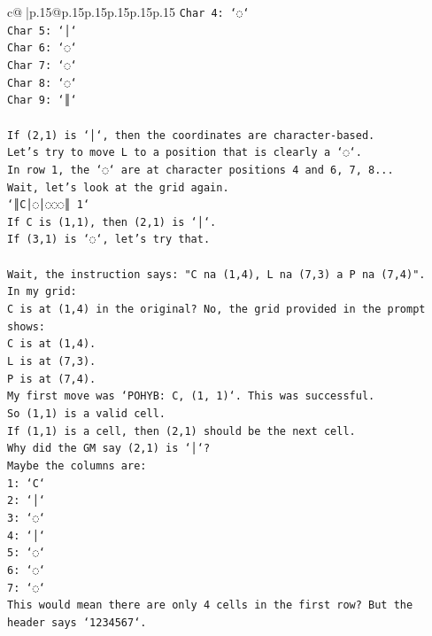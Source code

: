 \documentclass{article}
\begin{document}
{\begin{supertabular}{c@{$\;$}|p{.15\linewidth}@{}p{.15\linewidth}p{.15\linewidth}p{.15\linewidth}p{.15\linewidth}p{.15\linewidth}}
{{{\texttt{Char 4: `◌`} \\
\texttt{Char 5: `│`} \\
\texttt{Char 6: `◌`} \\
\texttt{Char 7: `◌`} \\
\texttt{Char 8: `◌`} \\
\texttt{Char 9: `║`} \\
\\ 
\texttt{If (2,1) is `│`, then the coordinates are character{-}based.} \\
\texttt{Let's try to move L to a position that is clearly a `◌`.} \\
\texttt{In row 1, the `◌` are at character positions 4 and 6, 7, 8...} \\
\texttt{Wait, let's look at the grid again.} \\
\texttt{`║C│◌│◌◌◌║ 1`} \\
\texttt{If C is (1,1), then (2,1) is `│`.} \\
\texttt{If (3,1) is `◌`, let's try that.} \\
\\ 
\texttt{Wait, the instruction says: "C na (1,4), L na (7,3) a P na (7,4)".} \\
\texttt{In my grid:} \\
\texttt{C is at (1,4) in the original? No, the grid provided in the prompt shows:} \\
\texttt{C is at (1,4).} \\
\texttt{L is at (7,3).} \\
\texttt{P is at (7,4).} \\
\texttt{My first move was `POHYB: C, (1, 1)`. This was successful.} \\
\texttt{So (1,1) is a valid cell.} \\
\texttt{If (1,1) is a cell, then (2,1) should be the next cell.} \\
\texttt{Why did the GM say (2,1) is `│`?} \\
\texttt{Maybe the columns are:} \\
\texttt{1: `C`} \\
\texttt{2: `│`} \\
\texttt{3: `◌`} \\
\texttt{4: `│`} \\
\texttt{5: `◌`} \\
\texttt{6: `◌`} \\
\texttt{7: `◌`} \\
\texttt{This would mean there are only 4 cells in the first row? But the header says `1234567`.} \\
}}}
\end{supertabular}}
\end{document}
